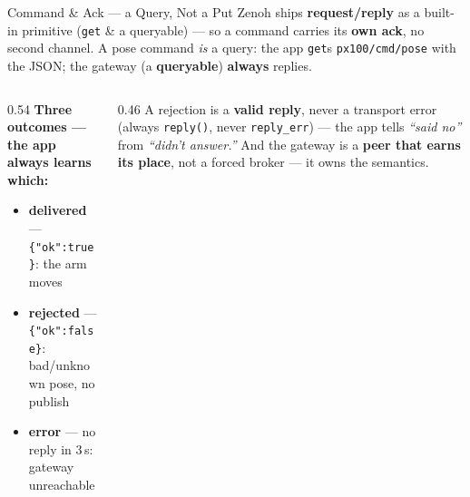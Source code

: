 \documentclass[9pt]{beamer}
\begin{document}
\begin{frame}{Command \& Ack --- a Query, Not a Put}
  Zenoh ships \textbf{request/reply} as a built-in primitive (\texttt{get} \& a queryable) --- so a command carries its \textbf{own ack}, no second channel. A pose command \emph{is} a query: the app \texttt{get}s \texttt{px100/cmd/pose} with the JSON; the gateway (a \textbf{queryable}) \textbf{always} replies.

  \vspace{0.05em}
  \begin{center}
  \end{center}

  \vspace{0.05em}
  \begin{columns}[T]
    \begin{column}{0.54\textwidth}
      \textbf{\small Three outcomes --- the app always learns which:}
      \begin{itemize}\small
        \item \textbf{delivered} --- \texttt{\{"ok":true\}}: the arm moves
        \item \textbf{rejected} --- \texttt{\{"ok":false\}}: bad/unknown pose, no publish
        \item \textbf{error} --- no reply in 3\,s: gateway unreachable
      \end{itemize}
    \end{column}
    \begin{column}{0.46\textwidth}
      {\small A rejection is a \textbf{valid reply}, never a transport error (always \texttt{reply()}, never \texttt{reply\_err}) --- the app tells \emph{``said no''} from \emph{``didn't answer.''} And the gateway is a \textbf{peer that earns its place}, not a forced broker --- it owns the semantics.}
    \end{column}
  \end{columns}
\end{frame}
\end{document}
